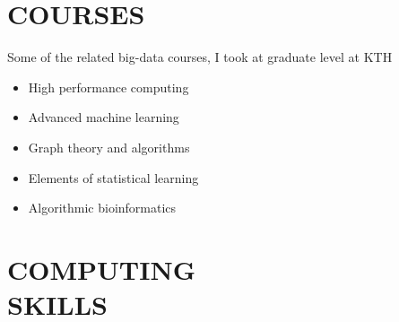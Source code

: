 \documentclass[margin, 10pt]{res} %
\begin{document}
\begin{resume}

\section{COURSES}

Some of the related big-data courses, I took at graduate level at KTH
\begin{itemize}
\item High performance computing
\item Advanced machine learning
\item Graph theory and algorithms
\item Elements of statistical learning
\item Algorithmic bioinformatics
\end{itemize} 


\section{COMPUTING \\ SKILLS} 


\end{resume}
\end{document}
